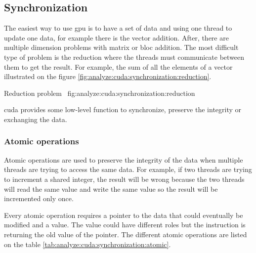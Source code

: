 \subsection{Synchronization}
\label{ch:analyze:cuda:synchronization}

The easiest way to use \acrshort{gpu} is to have a set of data and using one
thread to update one data, for example there is the vector addition.
After, there are multiple dimension problems with matrix or bloc addition.
The most difficult type of problem is the reduction where the threads must
communicate between them to get the result. For example, the sum of all the
elements of a vector illustrated on the figure \ref{fig:analyze:cuda:synchronization:reduction}.

{Reduction problem~\cite{cuda-training}}
{fig:analyze:cuda:synchronization:reduction}

\acrshort{cuda} provides some low-level function to synchronize, preserve the
integrity or exchanging the data.

\subsubsection{Atomic operations}
\label{ch:analyze:cuda:synchronization:atomic}

Atomic operations are used to preserve the integrity of the data when multiple
threads are trying to access the same data.
For example, if two threads are trying to increment a shared integer, the
result will be wrong because the two threads will read the same value and write
the same value so the result will be incremented only once.

Every atomic operation requires a pointer to the data that could eventually be
modified and a value.
The value could have different roles but the instruction is returning the old
value of the pointer.
The different atomic operations are listed on the table \ref{tab:analyze:cuda:synchronization:atomic}.

